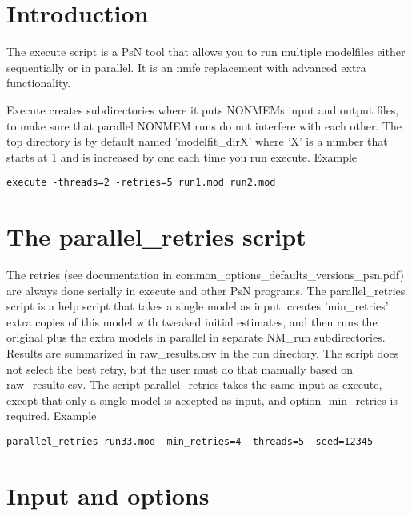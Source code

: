 



\maketitle


\section{Introduction}
The execute script is a PsN tool that allows you to run multiple modelfiles either sequentially or in parallel. It is an nmfe replacement with advanced extra
functionality.

Execute creates subdirectories where it puts NONMEMs input and output files, to make sure that parallel NONMEM runs do not interfere with each other.
The top directory is by default named 'modelfit\_dirX' where 'X' is a number that starts at 1 and is increased by one each time you run execute.
Example
\begin{verbatim}
execute -threads=2 -retries=5 run1.mod run2.mod
\end{verbatim}

\section{The parallel\_retries script}
The retries (see documentation in common\_options\_defaults\_versions\_psn.pdf) are always done serially in execute and other PsN programs. The parallel\_retries script is a help script that takes a single model as input, creates 'min\_retries' extra copies of this model with tweaked initial estimates, and then runs the original plus the extra models in parallel in separate NM\_run subdirectories. Results are summarized in raw\_results.csv in the run directory. The script does not select the best retry, but the user must do that manually based on raw\_results.csv. The script parallel\_retries takes the same input as execute, except that only a single model is accepted as input, and option -min\_retries is required. 
Example
\begin{verbatim}
parallel_retries run33.mod -min_retries=4 -threads=5 -seed=12345
\end{verbatim}

\section{Input and options}
